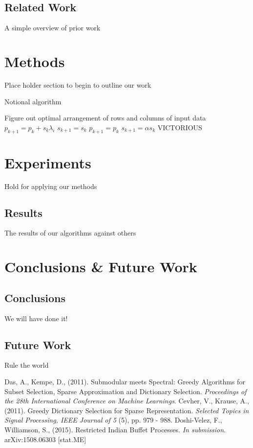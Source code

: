 \documentclass{article}
\begin{document}
\subsection{Related Work}
A simple overview of prior work


\section{Methods} \label{methods}

Place holder section to begin to outline our work

\begin{algorithm}
  \caption{Notional algorithm}
  \label{alg:compass}
\begin{algorithmic}
  \STATE  Figure out optimal arrangement of rows and columns of input data
  \STATE $p_{k+1} = p_k + s_k\lambda_i$
  \STATE $s_{k+1} = s_k$
  \ELSE
  \STATE $p_{k+1} = p_{k}$
  \STATE $s_{k+1} = \alpha s_k$
  \ENDIF
  \ENDWHILE
  \RETURN VICTORIOUS
\end{algorithmic}
\end{algorithm}

\section{Experiments} \label{experiments}

Hold for applying our methods

\subsection{Results} \label{results}

The results of our algorithms against others

\section{Conclusions \& Future Work}
\subsection{Conclusions}
We will have done it!
 
\subsection{Future Work}
Rule the world 

\begin{thebibliography}{99}
  Das, A., Kempe, D., (2011). Submodular meets Spectral: Greedy Algorithms for Subset Selection, Sparse Approximation and Dictionary Selection. \textit{Proceedings of the 28th International Conference on Machine Learnings}.
  Cevher, V., Krause, A., (2011). Greedy Dictionary Selection for Sparse Representation. \textit{Selected Topics in Signal Processing, IEEE Journal of 5} (5), pp. 979 - 988.
  Doshi-Velez, F., Williamson, S., (2015). Restricted Indian Buffet Processes. \textit{In submission}. arXiv:1508.06303 [stat.ME]
  
\end{thebibliography}
\end{document}
